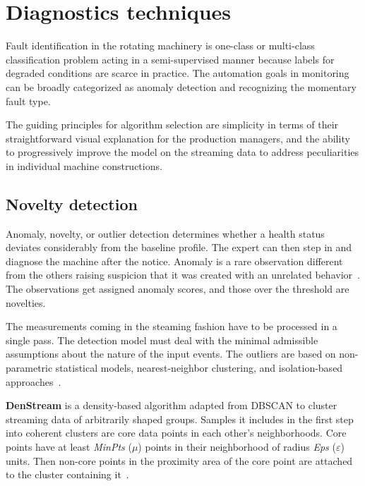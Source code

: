 \section{Diagnostics techniques} \label{section:diagnostics-techniques}
Fault identification in the rotating machinery is one-class or multi-class classification problem acting in a semi-supervised manner because labels for degraded conditions are scarce in practice. The automation goals in monitoring can be broadly categorized as anomaly detection and recognizing the momentary fault type.

The guiding principles for algorithm selection are simplicity in terms of their straightforward visual explanation for the production managers, and the ability to progressively improve the model on the streaming data to address peculiarities in individual machine constructions.

\subsection{Novelty detection}
Anomaly, novelty, or outlier detection determines whether a health status deviates considerably from the baseline profile. The expert can then step in and diagnose the machine after the notice. Anomaly is a rare observation different from the others raising suspicion that it was created with an unrelated behavior~\cite{aggarwal_outlier_2016}. The observations get assigned anomaly scores, and those over the threshold are novelties.

The measurements coming in the steaming fashion have to be processed in a single pass. The detection model must deal with the minimal admissible assumptions about the nature of the input events. The outliers are based on non-parametric statistical models, nearest-neighbor clustering, and isolation-based approaches~\cite{gervasi_anomaly_2020}.
\bigbreak

\textbf{DenStream} is a density-based algorithm adapted from DBSCAN to cluster streaming data of arbitrarily shaped groups. Samples it includes in the first step into coherent clusters are core data points in each other's neighborhoods. Core points have at least \emph{MinPts} ($\mu$) points in their neighborhood of radius \emph{Eps} ($\varepsilon$) units. Then non-core points in the proximity area of the core point are attached to the cluster containing it~\cite{aggarwal_data_2014}.

